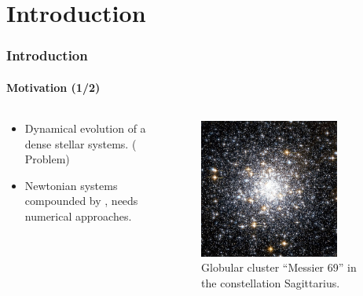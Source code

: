 \section{Introduction}

\begin{frame}
    \frametitle{Introduction}
    \framesubtitle{Motivation (1/2)}

    \begin{columns}
        \begin{column}{0.6\textwidth}
            \begin{itemize}
                \item Dynamical evolution of a dense stellar systems.
                      ({\nbody} Problem)
                \item Newtonian systems compounded by ,
                      needs numerical approaches.
            \end{itemize}
        \end{column}
        \begin{column}{0.4\textwidth}
            \begin{figure}
                \centering
                \includegraphics[width=0.8\textwidth]{img/m69}
                \caption{Globular cluster ``Messier 69'' in the constellation Sagittarius.}
                \label{fig:m69}
            \end{figure}
        \end{column}
    \end{columns}
\end{frame}

